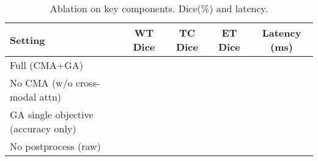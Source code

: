 \begin{table}[t]
\centering
\caption{Ablation on key components. Dice(\%) and latency.}
\label{tab:ablation}
\begin{tabular}{lcccc}
\toprule
Setting & WT Dice & TC Dice & ET Dice & Latency (ms) \\
\midrule
Full (CMA+GA) &  &  &  &  \\
No CMA (w/o cross-modal attn) &  &  &  &  \\
GA single objective (accuracy only) &  &  &  &  \\
No postprocess (raw) &  &  &  &  \\
\bottomrule
\end{tabular}
\end{table}
